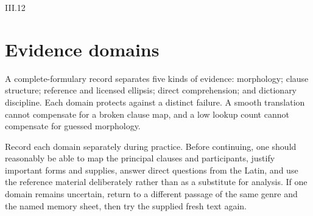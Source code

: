 \begin{courseunit}{III.12}
\section{Evidence domains}

A complete-formulary record separates five kinds of evidence: morphology;
clause structure; reference and licensed ellipsis; direct comprehension; and
dictionary discipline. Each domain protects against a distinct failure. A
smooth translation cannot compensate for a broken clause map, and a low lookup
count cannot compensate for guessed morphology.

Record each domain separately during practice. Before continuing, one should
reasonably be able to map the principal clauses and participants, justify
important forms and supplies, answer direct questions from the Latin, and use
the reference material deliberately rather than as a substitute for analysis.
If one domain remains uncertain, return to a different passage of the same
genre and the named memory sheet, then try the supplied fresh text again.
\end{courseunit}
